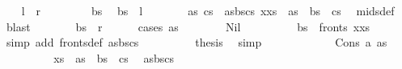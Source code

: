 \begin{isabellebody}
\isanewline
\ \ \isamarkupfalse%
\ {\isachardoublequoteopen}{\isacharquery}{\kern0pt}l\ {\isasymsubseteq}\ {\isacharquery}{\kern0pt}r{\isachardoublequoteclose}\isanewline
\ \ \isamarkupfalse%
\isanewline
\ \ \ \ \isamarkupfalse%
\ bs\ \isamarkupfalse%
\ {\isachardoublequoteopen}bs\ {\isasymin}\ {\isacharquery}{\kern0pt}l{\isachardoublequoteclose}\isanewline
\ \ \ \ \isamarkupfalse%
\ \isamarkupfalse%
\ as\ cs\ \ as{\isacharunderscore}{\kern0pt}bs{\isacharunderscore}{\kern0pt}cs{\isacharcolon}{\kern0pt}\ {\isachardoublequoteopen}{\isacharparenleft}{\kern0pt}x{\isacharhash}{\kern0pt}xs{\isacharparenright}{\kern0pt}\ {\isacharequal}{\kern0pt}\ as\ {\isacharat}{\kern0pt}\ bs\ {\isacharat}{\kern0pt}\ cs{\isachardoublequoteclose}\ \isamarkupfalse%
\ mids{\isacharunderscore}{\kern0pt}def\ \isamarkupfalse%
\ blast\isanewline
\ \ \ \ \isamarkupfalse%
\ \isamarkupfalse%
\ {\isachardoublequoteopen}bs\ {\isasymin}\ {\isacharquery}{\kern0pt}r{\isachardoublequoteclose}\isanewline
\ \ \ \ \isamarkupfalse%
\ {\isacharparenleft}{\kern0pt}cases\ as{\isacharparenright}{\kern0pt}\isanewline
\ \ \ \ \ \ \isamarkupfalse%
\ Nil\isanewline
\ \ \ \ \ \ \isamarkupfalse%
\ \isamarkupfalse%
\ {\isachardoublequoteopen}bs\ {\isasymin}\ fronts\ {\isacharparenleft}{\kern0pt}x{\isacharhash}{\kern0pt}xs{\isacharparenright}{\kern0pt}{\isachardoublequoteclose}\ \isamarkupfalse%
\ {\isacharparenleft}{\kern0pt}simp\ add{\isacharcolon}{\kern0pt}\ fronts{\isacharunderscore}{\kern0pt}def\ as{\isacharunderscore}{\kern0pt}bs{\isacharunderscore}{\kern0pt}cs{\isacharparenright}{\kern0pt}\isanewline
\ \ \ \ \ \ \isamarkupfalse%
\ \isamarkupfalse%
\ {\isacharquery}{\kern0pt}thesis\ \isamarkupfalse%
\ simp\isanewline
\ \ \ \ \isamarkupfalse%
\isanewline
\ \ \ \ \ \ \isamarkupfalse%
\ {\isacharparenleft}{\kern0pt}Cons\ a\ as{\isacharprime}{\kern0pt}{\isacharparenright}{\kern0pt}\isanewline
\ \ \ \ \ \ \isamarkupfalse%
\ \isamarkupfalse%
\ {\isachardoublequoteopen}xs\ {\isacharequal}{\kern0pt}\ as{\isacharprime}{\kern0pt}\ {\isacharat}{\kern0pt}\ bs\ {\isacharat}{\kern0pt}\ cs{\isachardoublequoteclose}\ \isamarkupfalse%
\ as{\isacharunderscore}{\kern0pt}bs{\isacharunderscore}{\kern0pt}cs\ \isamarkupfalse%

\end{isabellebody}
